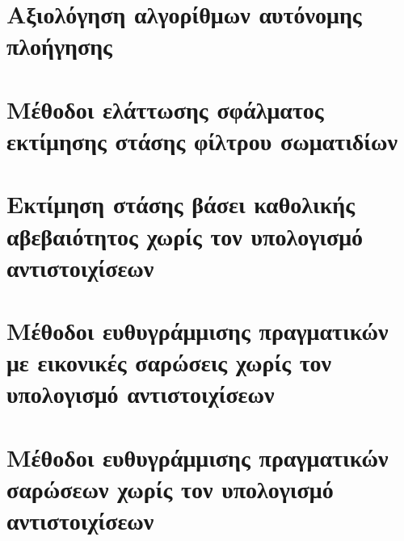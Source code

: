 \chapter{Αξιολόγηση αλγορίθμων αυτόνομης πλοήγησης}
  \label{part:02:chapter:01}

\chapter{Μέθοδοι ελάττωσης σφάλματος εκτίμησης στάσης φίλτρου σωματιδίων}
  \label{part:02:chapter:02}

\chapter{Εκτίμηση στάσης βάσει καθολικής αβεβαιότητος χωρίς τον υπολογισμό αντιστοιχίσεων}
  \label{part:02:chapter:03}

\chapter{Μέθοδοι ευθυγράμμισης πραγματικών με εικονικές σαρώσεις χωρίς τον υπολογισμό αντιστοιχίσεων}
  \label{part:02:chapter:04}
  

\chapter{Μέθοδοι ευθυγράμμισης πραγματικών σαρώσεων χωρίς τον υπολογισμό αντιστοιχίσεων}
  \label{part:02:chapter:05}
  
